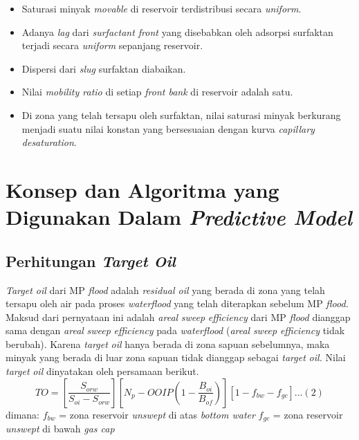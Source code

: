 \documentclass[
]{book}
\providecommand{\tightlist}{%
  \setlength{\itemsep}{0pt}\setlength{\parskip}{0pt}}
\begin{document}
\begin{enumerate}
  \begin{itemize}
  \tightlist
  \item
    Saturasi minyak \emph{movable} di reservoir terdistribusi secara \emph{uniform}.
  \item
    Adanya \emph{lag} dari \emph{surfactant front} yang disebabkan oleh adsorpsi surfaktan terjadi secara \emph{uniform} sepanjang reservoir.
  \item
    Dispersi dari \emph{slug} surfaktan diabaikan.
  \item
    Nilai \emph{mobility ratio} di setiap \emph{front bank} di reservoir adalah satu.
  \item
    Di zona yang telah tersapu oleh surfaktan, nilai saturasi minyak berkurang menjadi suatu nilai konstan yang bersesuaian dengan kurva \emph{capillary desaturation}.
  \end{itemize}
\end{enumerate}

\hypertarget{konsep-dan-algoritma-yang-digunakan-dalam-predictive-model}{%
\section{\texorpdfstring{Konsep dan Algoritma yang Digunakan Dalam \emph{Predictive Model}}{Konsep dan Algoritma yang Digunakan Dalam Predictive Model}}\label{konsep-dan-algoritma-yang-digunakan-dalam-predictive-model}}

\hypertarget{perhitungan-target-oil}{%
\subsection{\texorpdfstring{Perhitungan \emph{Target Oil}}{Perhitungan Target Oil}}\label{perhitungan-target-oil}}

\emph{Target oil} dari MP \emph{flood} adalah \emph{residual oil} yang berada di zona yang telah tersapu oleh air pada proses \emph{waterflood} yang telah diterapkan sebelum MP \emph{flood.} Maksud dari pernyataan ini adalah \emph{areal} \emph{sweep} \emph{efficiency} dari MP \emph{flood} dianggap sama dengan \emph{areal} \emph{sweep} \emph{efficiency} pada \emph{waterflood} (\emph{areal} \emph{sweep} \emph{efficiency} tidak berubah). Karena \emph{target} \emph{oil} hanya berada di zona sapuan sebelumnya, maka minyak yang berada di luar zona sapuan tidak dianggap sebagai \emph{target} \emph{oil.} Nilai \emph{target} \emph{oil} dinyatakan oleh persamaan berikut.
\[TO = \left[ \frac{S_{orw}}{S_{oi}-S_{orw}} \right] \left[N_p-OOIP \left( 1- \frac{B_{oi}}{B_{of}}\right) \right] \left[ 1-f_{bw}-f_{gc} \right]...(2)\]
dimana:
\(f_{bw}\) = zona reservoir \emph{unswept} di atas \emph{bottom water}
\(f_{gc}\) = zona reservoir \emph{unswept} di bawah \emph{gas cap}
\end{document}
